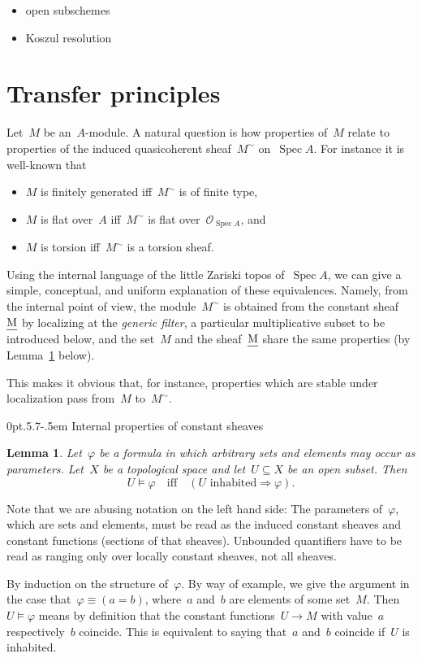 \documentclass[10pt,reqno,a4paper]{amsbook}
\makeatletter
\theoremstyle{definition}
\theoremstyle{plain}
\newtheorem{lemma}[defn]{Lemma}
\theoremstyle{remark}
\renewcommand{\O}{\mathcal{O}}
\let\oldul\ul
\renewcommand{\ul}[1]{\text{\oldul{$#1$}}}
\DeclareMathOperator{\Spec}{Spec}
\newcommand{\?}{\,{:}\,}
\renewcommand{\_}{\mathpunct{.}\,}
\renewenvironment{proof}[1][\proofname]{\par
  \pushQED{\qed}%
  \normalfont \topsep6\p@\@plus6\p@\relax
  \trivlist
  \item[\hskip\labelsep
        \itshape
    #1\@addpunct{.}]\ignorespaces
}{%
  \popQED\endtrivlist\@endpefalse
}
\def\subsection{\@startsection{subsection}{2}%
  {0pt}{.5\linespacing\@plus.7\linespacing}{-.5em}%
  {\normalfont\bfseries}}
\makeatother
\begin{document}
\begin{itemize}
\item open subschemes
\item Koszul resolution
\end{itemize}


\section{Transfer principles}

Let~$M$ be an~$A$-module. A natural question is how properties of~$M$
relate to properties of the induced quasicoherent sheaf~$M^\sim$
on~$\Spec A$. For instance it is well-known that
\begin{itemize}
\item $M$ is finitely generated iff~$M^\sim$ is of finite type,
\item $M$ is flat over~$A$ iff~$M^\sim$ is flat over~$\O_{\Spec A}$, and
\item $M$ is torsion iff~$M^\sim$ is a torsion sheaf.
\end{itemize}
Using the internal language of the little Zariski topos of~$\Spec A$, we can
give a simple, conceptual, and uniform explanation of these equivalences.
Namely, from the internal point of view, the module~$M^\sim$ is obtained from
the constant sheaf~$\ul{M}$ by localizing at the \emph{generic filter}, a
particular multiplicative subset to be introduced below, and the set~$M$ and
the sheaf~$\ul{M}$ share the same properties (by
Lemma~\ref{lemma:properties-of-constant-sheaves} below).

This makes it obvious that, for instance, properties which are stable under
localization pass from~$M$ to~$M^\sim$.


\subsection{Internal properties of constant sheaves}

\begin{lemma}\label{lemma:properties-of-constant-sheaves}Let~$\varphi$ be a
formula in which arbitrary sets and elements may occur as parameters. Let~$X$
be a topological space and let~$U \subseteq X$ be an open subset. Then
\[ U \models \varphi \quad\text{iff}\quad (\text{$U$ inhabited} \Rightarrow
\varphi). \]
\end{lemma}
Note that we are abusing notation on the left hand side: The parameters
of~$\varphi$, which are sets and elements, must be read as the induced constant
sheaves and constant functions (sections of that sheaves).
Unbounded quantifiers have to be read as ranging only over locally constant
sheaves, not all sheaves.
\begin{proof}By induction on the structure of~$\varphi$. By way of example, we
give the argument in the case that~$\varphi \equiv (a = b)$, where~$a$ and~$b$ are
elements of some set~$M$. Then~$U \models \varphi$ means by definition that the
constant functions~$U \to M$ with value~$a$ respectively~$b$ coincide. This is
equivalent to saying that~$a$ and~$b$ coincide if~$U$ is inhabited.
\end{proof}
\end{document}
